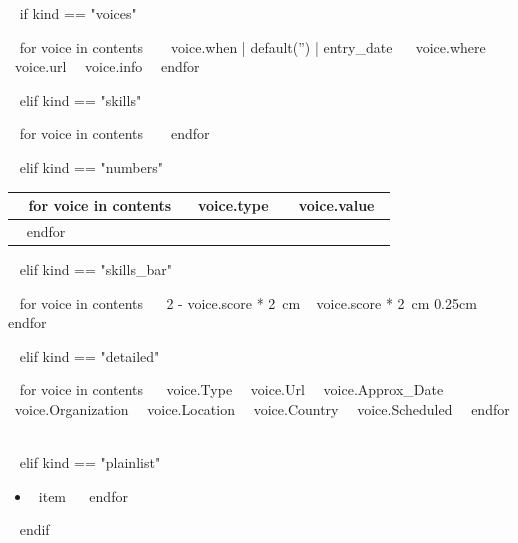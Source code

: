 
~{ if kind == "voices" }~

    ~{ for voice in contents }~
        {~{{ voice.when | default('') | entry_date }}~}
        {~{{voice.where}}~}
        {~{{voice.url}}~}       
        {~{{voice.info}}~}~{ endfor }~

~{ elif kind == "skills" }~
    
    ~{ for voice in contents }~
    ~{ endfor }~

~{ elif kind == "numbers" }~
    
    \begin{tabularx}{\linewidth}{|X|c|}
    \hline
    ~{ for voice in contents }~
    ~{{voice.type}}~ & ~{{voice.value}}~ \\
    \hline
    ~{ endfor }~
    \end{tabularx}
    \vspace{1em}

~{ elif kind == "skills_bar" }~
    
    ~{ for voice in contents }~
    {~{{2 - voice.score * 2}}~cm}
    {~{{    voice.score * 2}}~cm}
    {0.25cm}~{ endfor }~

~{ elif kind == "detailed" }~

    ~{ for voice in contents }~
        {~{{voice.Type}}~}
        {~{{voice.Url}}~}
        {~{{voice.Approx_Date}}~}
        {~{{voice.Organization}}~}
        {~{{voice.Location}}~}
        {~{{voice.Country}}~}
        {~{{voice.Scheduled}}~}~{ endfor }~

~{ elif kind == "plainlist" }~
    
    \begin{itemize}[leftmargin=*, itemsep=0pt, parsep=0pt, topsep=0pt, partopsep=0pt]
    ~{ for item in contents }~
    \item[$\cdot$] ~{{item}}~
    ~{ endfor }~
    \end{itemize}
    \vspace{1em}

~{ endif }~



